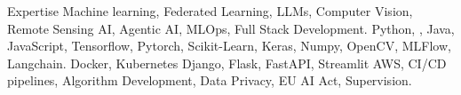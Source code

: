 
\begin{rubric}{Expertise}
\entry*[Competences]
	Machine learning, Federated Learning, LLMs, Computer Vision, Remote Sensing AI,  Agentic AI, MLOps, Full Stack Development.
	Python, , Java, JavaScript, 
\entry*[ML Frameworks]
	Tensorflow, Pytorch, Scikit-Learn, Keras, Numpy, OpenCV, MLFlow, Langchain.
\entry*[Infrastructure]
	Docker, Kubernetes
	Django, Flask, FastAPI, Streamlit
\entry*[Others]
	AWS, CI/CD pipelines, Algorithm Development, Data Privacy, EU AI Act, Supervision.
\end{rubric}
